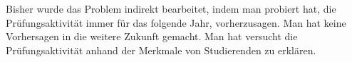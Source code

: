 Bisher wurde das Problem indirekt bearbeitet, indem man probiert hat, die Pr\"ufungsaktivit\"at
immer f\"ur das folgende Jahr, vorherzusagen. Man hat keine Vorhersagen in die weitere Zukunft gemacht.
Man hat versucht die Pr\"ufungsaktivit\"at anhand der Merkmale von Studierenden zu erkl\"aren. \\

